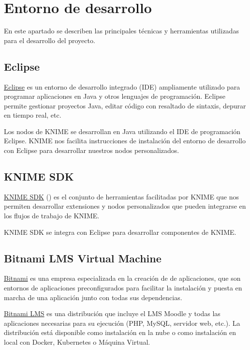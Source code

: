 

\section{Entorno de desarrollo}

En este apartado se describen las principales técnicas y herramientas utilizadas para el desarrollo del proyecto. 


\subsection{Eclipse}

\href{https://www.eclipse.org/ide/}{Eclipse} es un entorno de desarrollo integrado (IDE) ampliamente utilizado para programar aplicaciones en Java y 
otros lenguajes de programación. Eclipse permite gestionar proyectos Java, editar código con resaltado de sintaxis,
 depurar en tiempo real, etc. 
\

Los nodos de KNIME se desarrollan en Java utilizando el IDE de programación Eclipse. KNIME nos facilita instrucciones de 
instalación del entorno de desarrollo con Eclipse para desarrollar nuestros nodos personalizados. 


\subsection{KNIME SDK}


\href{https://github.com/knime/knime-sdk-setup}{KNIME SDK} () es el conjunto de herramientas facilitadas por KNIME que nos permiten desarrollar 
extensiones y nodos personalizados que pueden integrarse en los flujos de trabajo de KNIME.
\

KNIME SDK se integra con Eclipse para desarrollar componentes de KNIME. 


\subsection{Bitnami LMS Virtual Machine}

\href{https://bitnami.com/}{Bitnami} es una empresa especializada en la creación de  de aplicaciones, 
que son entornos de aplicaciones preconfigurados para facilitar la instalación y puesta en marcha de una aplicación junto 
con todas sus dependencias. 
\

\href{https://bitnami.com/stack/moodle}{Bitnami LMS} es una distribución que incluye el LMS Moodle y todas las aplicaciones 
necesarias para su ejecución (PHP, MySQL, servidor web, etc.). La distribución está disponible como instalación en la nube 
o como instalación en local con Docker, Kubernetes o Máquina Virtual. 
\

